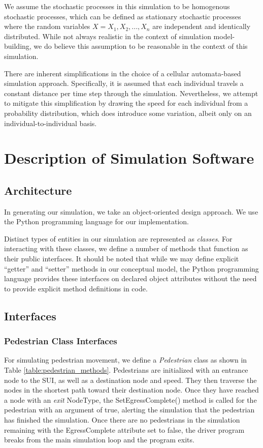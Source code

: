 \documentclass[12pt]{article}
\begin{document}
We assume the stochastic processes in this simulation to be homogenous
stochastic processes, which can be defined as stationary stochastic processes
where the random variables $X = X_1, X_2, ..., X_n$ are independent and
identically distributed. While not always realistic in the context of
simulation model-building, we do believe this assumption to be reasonable in
the context of this simulation.

There are inherent simplifications in the choice of a cellular automata-based
simulation approach. Specifically, it is assumed that each individual travels
a constant distance per time step through the simulation. Nevertheless, we
attempt to mitigate this simplification by drawing the speed for each
individual from a probability distribution, which does introduce some
variation, albeit only on an individual-to-individual basis.

\section{Description of Simulation Software}

\subsection{Architecture}
In generating our simulation, we take an object-oriented design approach. We use
the Python programming language for our implementation.

Distinct types of entities in our simulation are represented as
\textit{classes}. For interacting with these classes, we define a number of
methods that function as their public interfaces. It should be noted that while
we may define explicit ``getter'' and ``setter'' methods in our conceptual model,
the Python programming language provides these interfaces on declared object
attributes without the need to provide explicit method definitions in code.

\subsection{Interfaces}

\subsubsection{Pedestrian Class Interfaces}
For simulating pedestrian movement, we define a \textit{Pedestrian} class as
shown in Table \ref{table:pedestrian_methods}. Pedestrians are initialized with
an entrance node to the SUI, as well as a destination node and speed. They then
traverse the nodes in the shortest path toward their destination node. Once
they have reached a node with an \textit{exit} NodeType, the
SetEgressComplete() method is called for the pedestrian with an argument of
true, alerting the simulation that the pedestrian has finished the simulation.
Once there are no pedestrians in the simulation remaining with the
EgressComplete attribute set to false, the driver program breaks from the main
simulation loop and the program exits.
\end{document}
